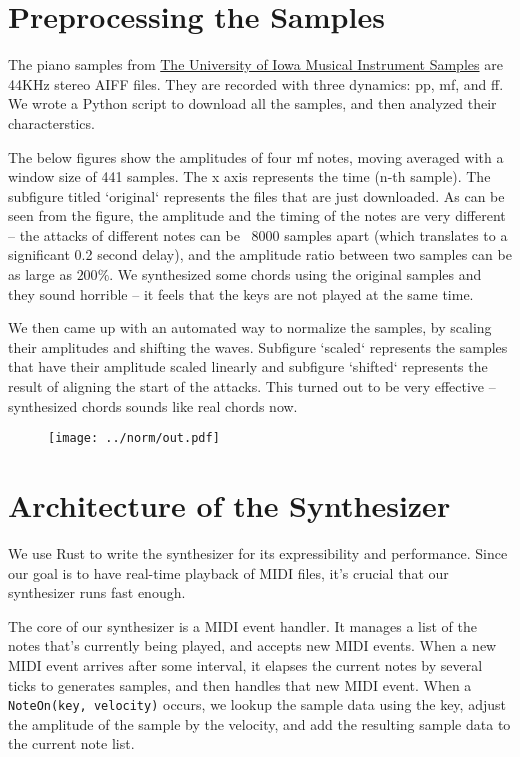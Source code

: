 \documentclass{article}
\begin{document}
\section{Preprocessing the Samples}

The piano samples from
\href{http://theremin.music.uiowa.edu/MIS.html}
  {The University of Iowa Musical Instrument Samples} are 44KHz stereo
  AIFF files. They are recorded with three dynamics: pp, mf, and ff.
  We wrote a Python script to download all the samples, and then analyzed
  their characterstics.

The below figures show the amplitudes of four mf notes, moving averaged
with a window size of 441 samples. The x axis represents the time (n-th
sample). The subfigure
titled `original` represents the files that are just downloaded. As can be seen
from the figure, the amplitude and the timing of the notes are very
different -- the attacks of different notes can be ~8000 samples apart
(which translates to a significant 0.2 second delay), and the amplitude
ratio between two samples can be as large as $200\%$. 
We synthesized some chords using the original samples and they sound horrible
-- it feels that the keys are not played at the same time.

We then came up with an automated way to normalize the samples, by
scaling their amplitudes and shifting the waves. Subfigure `scaled`
represents the samples that have their amplitude scaled linearly
and subfigure `shifted` represents the result of aligning the start of
the attacks. This turned out to be very effective -- synthesized chords
sounds like real chords now.

\begin{figure}[ht]
  \centering
  \texttt{[image: ../norm/out.pdf]}
\end{figure}

\section{Architecture of the Synthesizer}

We use Rust to write the synthesizer for its expressibility and performance.
Since our goal is to have real-time playback of MIDI files, it's crucial
that our synthesizer runs fast enough.

The core of our synthesizer is a MIDI event handler. It manages a list of the
notes that's currently being played, and accepts new MIDI events. When a new MIDI
event arrives after some interval, it elapses the current notes by several
ticks to generates samples, and then handles that new MIDI event. When a
\texttt{NoteOn(key, velocity)} occurs, we lookup the sample data using the key,
adjust the amplitude of the sample by the velocity, and add the resulting
sample data to the current note list.
\end{document}
